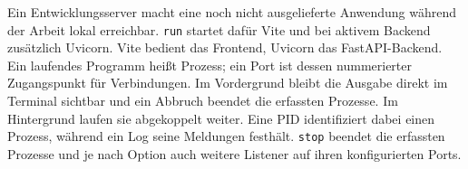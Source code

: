 \begin{beginnerstatement}

Ein Entwicklungsserver macht eine noch nicht ausgelieferte Anwendung während
der Arbeit lokal erreichbar. \texttt{run} startet dafür Vite und bei aktivem
Backend zusätzlich Uvicorn. Vite bedient das Frontend, Uvicorn das
FastAPI-Backend. Ein laufendes Programm heißt Prozess; ein Port ist dessen
nummerierter Zugangspunkt für Verbindungen. Im Vordergrund bleibt die Ausgabe
direkt im Terminal sichtbar und ein Abbruch beendet die erfassten Prozesse. Im
Hintergrund laufen sie abgekoppelt weiter. Eine PID identifiziert dabei einen
Prozess, während ein Log seine Meldungen festhält. \texttt{stop} beendet die
erfassten Prozesse und je nach Option auch weitere Listener auf ihren
konfigurierten Ports.

\end{beginnerstatement}
